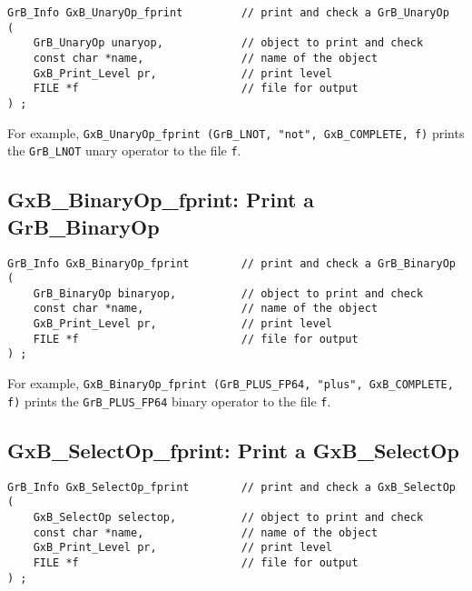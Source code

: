 \documentclass[12pt]{article}
\begin{document}
\begin{mdframed}[userdefinedwidth=6in]
{\footnotesize
\begin{verbatim}
GrB_Info GxB_UnaryOp_fprint         // print and check a GrB_UnaryOp
(
    GrB_UnaryOp unaryop,            // object to print and check
    const char *name,               // name of the object
    GxB_Print_Level pr,             // print level
    FILE *f                         // file for output
) ;
\end{verbatim} } \end{mdframed}

For example,
\verb'GxB_UnaryOp_fprint (GrB_LNOT, "not", GxB_COMPLETE, f)'
prints the \verb'GrB_LNOT' unary operator to the file \verb'f'.


\subsection{{\sf GxB\_BinaryOp\_fprint:} Print a {\sf GrB\_BinaryOp}}

\begin{mdframed}[userdefinedwidth=6in]
{\footnotesize
\begin{verbatim}
GrB_Info GxB_BinaryOp_fprint        // print and check a GrB_BinaryOp
(
    GrB_BinaryOp binaryop,          // object to print and check
    const char *name,               // name of the object
    GxB_Print_Level pr,             // print level
    FILE *f                         // file for output
) ;
\end{verbatim} } \end{mdframed}

For example,
\verb'GxB_BinaryOp_fprint (GrB_PLUS_FP64, "plus", GxB_COMPLETE, f)' prints the
\verb'GrB_PLUS_FP64' binary operator to the file \verb'f'.


\subsection{{\sf GxB\_SelectOp\_fprint:} Print a {\sf GxB\_SelectOp}}

\begin{mdframed}[userdefinedwidth=6in]
{\footnotesize
\begin{verbatim}
GrB_Info GxB_SelectOp_fprint        // print and check a GxB_SelectOp
(
    GxB_SelectOp selectop,          // object to print and check
    const char *name,               // name of the object
    GxB_Print_Level pr,             // print level
    FILE *f                         // file for output
) ;
\end{verbatim} } \end{mdframed}
\end{document}
